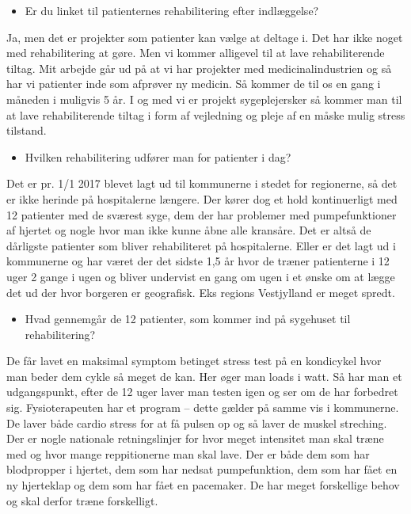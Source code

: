 \begin{itemize}
	\item Er du linket til patienternes rehabilitering efter indlæggelse? 
\end{itemize} 
Ja, men det er projekter som patienter kan vælge at deltage i. Det har ikke noget med rehabilitering at gøre. Men vi kommer alligevel til at lave rehabiliterende tiltag. Mit arbejde går ud på at vi har projekter med medicinalindustrien og så har vi patienter inde som afprøver ny medicin. Så kommer de til os en gang i måneden i muligvis 5 år. I og med vi er projekt sygeplejersker så kommer man til at lave rehabiliterende tiltag i form af vejledning og pleje af en måske mulig stress tilstand. 

\begin{itemize}
	\item Hvilken rehabilitering udfører man for patienter i dag? 
\end{itemize} 
Det er pr. 1/1 2017 blevet lagt ud til kommunerne i stedet for regionerne, så det er ikke herinde på hospitalerne længere. Der kører dog et hold kontinuerligt med 12 patienter med de sværest syge, dem der har problemer med pumpefunktioner af hjertet og nogle hvor man ikke kunne åbne alle kransåre. Det er altså de dårligste patienter som bliver rehabiliteret på hospitalerne. Eller er det lagt ud i kommunerne og har været der det sidste 1,5 år hvor de træner patienterne i 12 uger 2 gange i ugen og bliver undervist en gang om ugen i et ønske om at lægge det ud der hvor borgeren er geografisk. Eks regions Vestjylland er meget spredt. 

\begin{itemize}
	\item Hvad gennemgår de 12 patienter, som kommer ind på sygehuset til rehabilitering? 
\end{itemize} 
De får lavet en maksimal symptom betinget stress test på en kondicykel hvor man beder dem cykle så meget de kan. Her øger man loads i watt. Så har man et udgangspunkt, efter de 12 uger laver man testen igen og ser om de har forbedret sig. Fysioterapeuten har et program – dette gælder på samme vis i kommunerne. De laver både cardio stress for at få pulsen op og så laver de muskel streching. Der er nogle nationale retningslinjer for hvor meget intensitet man skal træne med og hvor mange reppitionerne man skal lave. Der er både dem som har blodpropper i hjertet, dem som har nedsat pumpefunktion, dem som har fået en ny hjerteklap og dem som har fået en pacemaker. De har meget forskellige behov og skal derfor træne forskelligt. 

